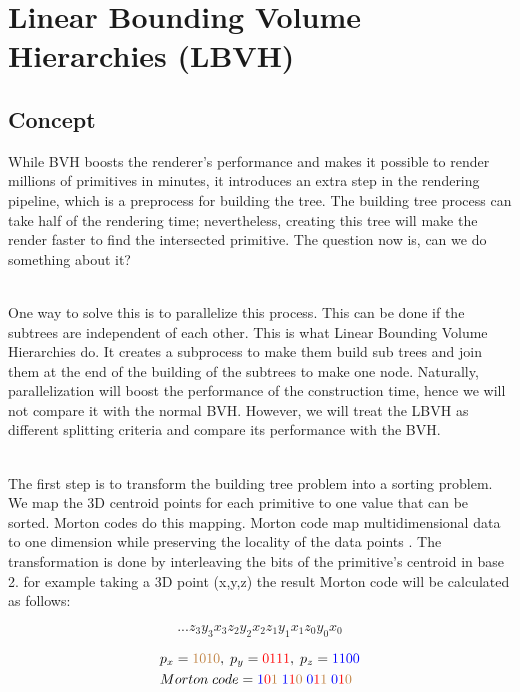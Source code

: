 \documentclass[11pt,a4paper]{article}
\begin{document}
\clearpage

\section{Linear Bounding Volume Hierarchies (LBVH)}
\subsection{Concept}
While BVH boosts the renderer's performance and makes it possible to render millions of primitives in minutes, it introduces an extra step in the rendering pipeline, which is a preprocess for building the tree. The building tree process can take half of the rendering time; nevertheless, creating this tree will make the render faster to find the intersected primitive. The question now is, can we do something about it? 

\noindent
\\
One way to solve this is to parallelize this process. This can be done if the subtrees are independent of each other. This is what Linear Bounding Volume Hierarchies do. It creates a subprocess to make them build sub trees and join them at the end of the building of the subtrees to make one node. Naturally, parallelization will boost the performance of the construction time, hence we will not compare it with the normal BVH. However, we will treat the LBVH as different splitting criteria and compare its performance with the BVH.

\noindent
\\
The first step is to transform the building tree problem into a sorting problem. We map the 3D centroid points for each primitive to one value that can be sorted. Morton codes do this mapping. Morton code map multidimensional data to one dimension while preserving the locality of the data points \protect\cite{wikipedia2022}. The transformation is done by interleaving the bits of the primitive's centroid in base 2. for example taking a 3D point (x,y,z) the result Morton code will be calculated as follows: 
 
\begin{equation}
 ...z_3y_3x_3z_2y_2x_2z_1y_1x_1z_0y_0x_0
\end{equation}

\begin{align*}
& p_x = \textcolor{brown}{1010}, \;p_y = \textcolor{red}{0111}, \;p_z = \textcolor{blue}{1100} \\
&Morton\;code = \textcolor{blue}{1}\textcolor{red}{0}\textcolor{brown}{1} \;\textcolor{blue}{1}\textcolor{red}{1}\textcolor{brown}{0} \;\textcolor{blue}{0}\textcolor{red}{1}\textcolor{brown}{1} \;\textcolor{blue}{0}\textcolor{red}{1}\textcolor{brown}{0}
\end{align*}
\end{document}
